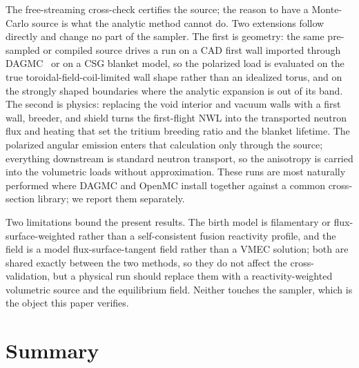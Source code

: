 \documentclass[11pt]{article}
\begin{document}
The free-streaming cross-check certifies the source; the reason to have a Monte-Carlo
source is what the analytic method cannot do. Two extensions follow directly and change no
part of the sampler. The first is geometry: the same pre-sampled or compiled source drives
a run on a CAD first wall imported through DAGMC~\cite{dagmc} or on a CSG blanket model,
so the polarized load is evaluated on the true toroidal-field-coil-limited wall shape
rather than an idealized torus, and on the strongly shaped boundaries where the analytic
expansion is out of its band. The second is physics: replacing the void interior and
vacuum walls with a first wall, breeder, and shield turns the first-flight NWL into the
transported neutron flux and heating that set the tritium breeding ratio and the blanket
lifetime. The polarized angular emission enters that calculation only through the source;
everything downstream is standard neutron transport, so the anisotropy is carried into the
volumetric loads without approximation. These runs are most naturally performed where
DAGMC and OpenMC install together against a common cross-section library; we report them
separately.

Two limitations bound the present results. The birth model is filamentary or
flux-surface-weighted rather than a self-consistent fusion reactivity profile, and the
field is a model flux-surface-tangent field rather than a VMEC solution; both are shared
exactly between the two methods, so they do not affect the cross-validation, but a
physical run should replace them with a reactivity-weighted volumetric source and the
equilibrium field. Neither touches the sampler, which is the object this paper verifies.

\section{Summary}
\label{sec:summary}
\end{document}
